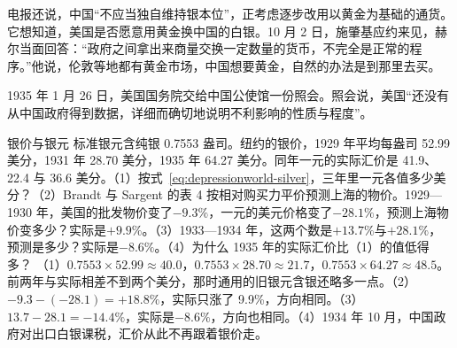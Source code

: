 电报还说，中国“不应当独自维持银本位”，正考虑逐步改用以黄金为基础的通货\cite{frus1934}。它想知道，美国是否愿意用黄金换中国的白银\cite{frus1934}。10 月 2 日，施肇基应约来见，赫尔当面回答：“政府之间拿出来商量交换一定数量的货币，不完全是正常的程序。”\cite{frus1934}他说，伦敦等地都有黄金市场，中国想要黄金，自然的办法是到那里去买\cite{frus1934}。

1935 年 1 月 26 日，美国国务院交给中国公使馆一份照会\cite{frus1935}。照会说，美国“还没有从中国政府得到数据，详细而确切地说明不利影响的性质与程度”\cite{frus1935}。


\begin{example}{银价与银元}\label{ex:depressionworld-silver}
标准银元含纯银 0.7553 盎司。纽约的银价，1929 年平均每盎司 52.99 美分，1931 年 28.70 美分，1935 年 64.27 美分\cite{census1975m}。同年一元的实际汇价是 41.9、22.4 与 36.6 美分\cite{bms1943}。（1）按式~\eqref{eq:depressionworld-silver}，三年里一元各值多少美分？（2）Brandt 与 Sargent 的表 4 按相对购买力平价预测上海的物价。1929—1930 年，美国的批发物价变了$-9.3\%$，一元的美元价格变了$-28.1\%$，预测上海物价变多少？实际是$+9.9\%$。（3）1933—1934 年，这两个数是$+13.7\%$与$+28.1\%$，预测是多少？实际是$-8.6\%$。（4）为什么 1935 年的实际汇价比（1）的值低得多？
\solution （1）$0.7553\times52.99\approx40.0$，$0.7553\times28.70\approx21.7$，$0.7553\times64.27\approx48.5$。前两年与实际相差不到两个美分，那时通用的旧银元含银还略多一点。（2）$-9.3-(-28.1)=+18.8\%$，实际只涨了 9.9\%，方向相同。（3）$13.7-28.1=-14.4\%$，实际是$-8.6\%$，方向也相同\cite{brandt1989}。（4）1934 年 10 月，中国政府对出口白银课税，汇价从此不再跟着银价走。
\end{example}

